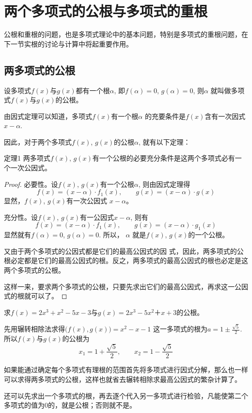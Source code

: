 \section{两个多项式的公根与多项式的重根}
公根和重根的问题，也是多项式理论中的基本问题，特别是多项式的重根问题，在下一节实根的讨论与计算中将起重要作用。

\subsection{两多项式的公根} 
设多项式$f(x)$与$g(x)$都有一个根$\alpha$, 即$f(\alpha )=0$, $g(\alpha )=0$, 则$\alpha$ 就叫做多项式$f(x)$与$g(x)$的公根。

由因式定理可以知道，多项式$f(x)$有一个根$\alpha$ 的充要条件是$f(x)$含有一次因式$x-\alpha$.

因此，对于两个多项式$f(x)$, $g(x)$的公根$\alpha$, 就有以下定理：

\begin{blk}{定理1}
    两多项式$f(x)$, $g(x)$有一个公根的必要充分条件是这两个多项式必有一个一次公因式。
\end{blk}

\begin{proof}
    必要性。设$f(x)$, $g(x)$有一个公根$\alpha$, 则由因式定理得
\[f (x) = (x-\alpha ) \cdot f_1 (x),\qquad g(x)=(x-\alpha )\cdot g (x)\]
显然，$f(x)$, $g(x)$有一次公因式 $x-\alpha$。

充分性。设$f(x)$, $g(x)$有一公因式$x-\alpha$, 则有
\[f (x) = (x-\alpha ) \cdot f_1 (x),\qquad g (x) = (x-\alpha ) \cdot g_1 (x)\]
显然就有$f(\alpha )=0$, $g(\alpha )=0$. 所以，
$\alpha$ 就是$f(x)$, $g(x)$的一个公根。

又由于两个多项式的公因式都是它们的最高公因式的因
式，因此，两多项式的公根必定都是它们的最高公因式的根。反之，两多项式的最高公因式的根也必定是这两个多项式的公根。

这样一来，要求两个多项式的公根，只要先求出它们的最高公因式，再求这一公因式的根就可以了。
\end{proof}

\begin{example}
    求$f(x)=2x^3+x^2-5x-3$与$g(x)=2x^3-5x^2＋x+3$的公根。
\end{example}

\begin{solution}
    先用辗转相除法求得$\big(f (x) ,g (x) \big) =x^2-x-1$
    这一多项式的根为$a=1\pm\frac{\sqrt{5}}{2}$. 所以$f(x)$与$g(x)$的公根为
\[x_1=1+\frac{\sqrt{5}}{2},\qquad x_2=1-\frac{\sqrt{5}}{2}\]
    
    如果能通过确定每个多项式有理根的范围首先将多项式进行因式分解，那么也一样可以求得两多项式的公根，这样也就省去辗转相除求最高公因式的繁杂计算了。

    还可以先求出一个多项式的根，再去逐个代入另一多项式进行检验，凡能使第二个多项式的值为0的，就是公根；否则就不是。
\end{solution}

